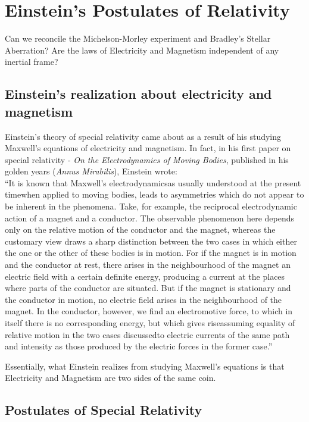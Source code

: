 \documentclass[a4paper,11pt]{article}
\numberwithin{equation}{section}
\begin{document}
 \section{Einstein's Postulates of Relativity}
 Can we reconcile the Michelson-Morley experiment and Bradley's Stellar Aberration? Are the laws of Electricity and Magnetism independent of any inertial frame?
 \subsection{Einstein's realization about electricity and magnetism}
 \indent Einstein's theory of special relativity came about as a result of his studying Maxwell's equations of electricity and magnetism. In fact, in his first paper on special relativity - \textit{On the Electrodynamics of Moving Bodies}, published in his golden years (\textit{Annus Mirabilis}), Einstein wrote:\smallskip\\
 \indent ``It is known that Maxwell\textquoteright s electrodynamics\textemdash as usually understood at the present time\textemdash when applied to moving bodies, leads to asymmetries which do not appear to be inherent in the phenomena. Take, for example, the reciprocal electrodynamic action of a magnet and a conductor. The observable phenomenon here depends only on the relative motion of the conductor and the magnet, whereas the customary view draws a sharp distinction between the two cases in which either the one or the other of these bodies is in motion. For if the magnet is in motion and the conductor at rest, there arises in the neighbourhood of the magnet an electric field with a certain definite energy, producing a current at the places where parts of the conductor are situated. But if the magnet is stationary and the conductor in motion, no electric field arises in the neighbourhood of the magnet. In the conductor, however, we find an electromotive force, to which in itself there is no corresponding energy, but which gives rise\textemdash assuming equality of relative motion in the two cases discussed\textemdash to electric currents of the same path and intensity as those produced by the electric forces in the former case.''
 
 \noindent Essentially, what Einstein realizes from studying Maxwell's equations is that Electricity and Magnetism are two sides of the same coin.
 
 \subsection{Postulates of Special Relativity}
\end{document}
